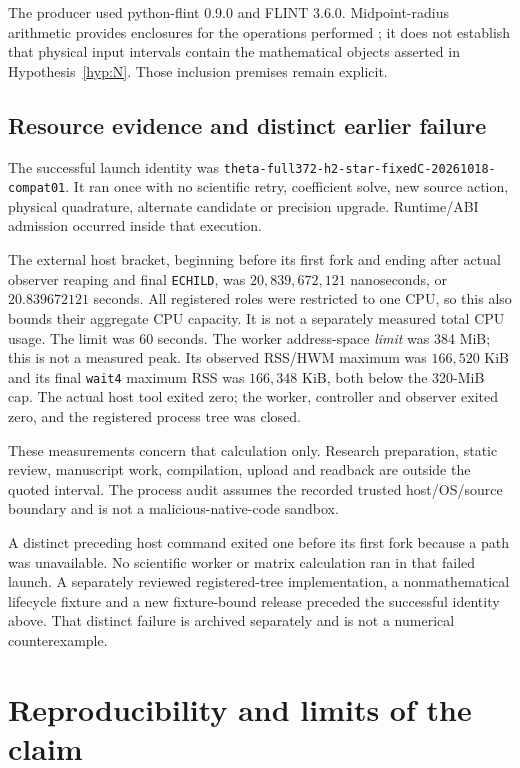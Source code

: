 \documentclass[11pt,a4paper]{article}
\theoremstyle{definition}
\theoremstyle{remark}
\numberwithin{equation}{section}
\begin{document}
The producer used python-flint 0.9.0 and FLINT 3.6.0. Midpoint-radius
arithmetic provides enclosures for the operations performed
\cite{johansson}; it does not establish that physical input intervals
contain the mathematical objects asserted in Hypothesis~\ref{hyp:N}.
Those inclusion premises remain explicit.

\subsection{Resource evidence and distinct earlier failure}\label{sec:resources}

The successful launch identity was
\texttt{theta-full372-h2-star-fixedC-20261018-compat01}.
It ran once with no scientific retry, coefficient solve, new source action,
physical quadrature, alternate candidate or precision upgrade.
Runtime/ABI admission occurred inside that execution.

The external host bracket, beginning before its first fork and ending
after actual observer reaping and final \texttt{ECHILD}, was
\(20{,}839{,}672{,}121\) nanoseconds, or \(20.839672121\) seconds.
All registered roles were restricted to one CPU, so this also bounds
their aggregate CPU capacity. It is not a separately measured total CPU
usage. The limit was 60 seconds.
The worker address-space \emph{limit} was 384 MiB; this is not a measured
peak. Its observed RSS/HWM maximum was \(166{,}520\) KiB and its final
\texttt{wait4} maximum RSS was \(166{,}348\) KiB, both below the 320-MiB
cap. The actual host tool exited zero; the worker, controller and observer
exited zero, and the registered process tree was closed.

These measurements concern that calculation only. Research preparation,
static review, manuscript work, compilation, upload and readback are
outside the quoted interval. The process audit assumes the recorded trusted
host/OS/source boundary and is not a malicious-native-code sandbox.

A distinct preceding host command exited one before its first fork because
a  path was unavailable. No scientific worker or
matrix calculation ran in that failed launch. A separately reviewed
registered-tree implementation, a nonmathematical lifecycle fixture and a
new fixture-bound release preceded the successful identity above.
That distinct failure is archived separately and is not a numerical counterexample.

\section{Reproducibility and limits of the claim}\label{sec:limits}
\end{document}
